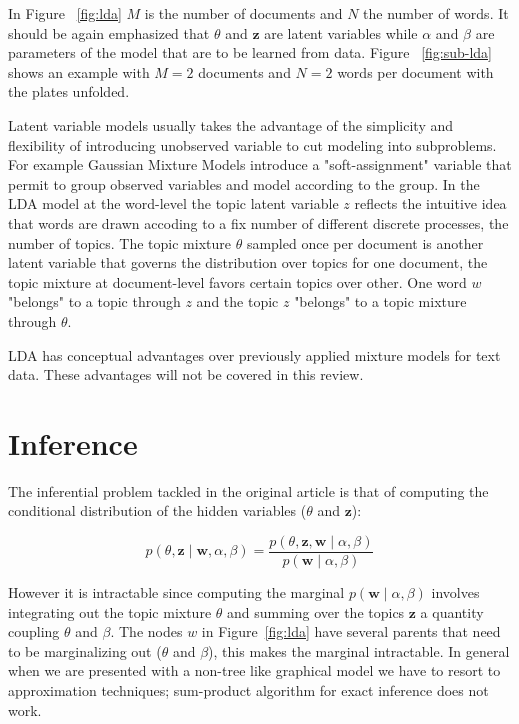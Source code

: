 \documentclass[12pt,a4paper,onecolumn]{article}
\begin{document}

{
}{}{}


In Figure ~\ref{fig:lda} $M$ is the number of documents and $N$ the number of words. It should be again emphasized that $\theta$ and $\mathbf{z}$ are latent variables while $\alpha$ and $\beta$ are parameters of the model that are to be learned from data. Figure ~\ref{fig:sub-lda} shows an example with $M=2$ documents and $N=2$ words per document with the plates unfolded.

Latent variable models usually takes the advantage of the simplicity and flexibility of introducing unobserved variable to cut modeling into subproblems. For example Gaussian Mixture Models introduce a "soft-assignment" variable that permit to group observed variables and model according to the group. In the LDA model at the word-level the topic latent variable $z$ reflects the intuitive idea that words are drawn accoding to a fix number of different discrete processes, the number of topics. The topic mixture $\theta$ sampled once per document is another latent variable that governs the distribution over topics for one document, the topic mixture at document-level favors certain topics over other. One word $w$ "belongs" to a topic through $z$ and the topic $z$ "belongs" to a topic mixture through $\theta$.

LDA has conceptual advantages over previously applied mixture models for text data. These advantages will not be covered in this review.


\section{Inference}
\label{sec:inference}

The inferential problem tackled in the original article is that of computing the conditional distribution of the hidden variables ($\theta$ and $\mathbf{z}$):

$$p(\theta, \mathbf{z} \mid \mathbf{w}, \alpha, \beta) = \frac{p(\theta, \mathbf{z}, \mathbf{w} \mid \alpha, \beta)}{p(\mathbf{w} \mid \alpha, \beta)}$$

However it is intractable since computing the marginal $p(\mathbf{w} \mid \alpha, \beta)$ involves integrating out the topic mixture $\theta$ and summing over the topics $\mathbf{z}$ a quantity coupling $\theta$ and $\beta$. The nodes $w$ in Figure~\ref{fig:lda} have several parents that need to be marginalizing out ($\theta$ and $\beta$), this makes the marginal intractable. In general when we are presented with a non-tree like graphical model we have to resort to approximation techniques; sum-product algorithm for exact inference does not work.
\end{document}
